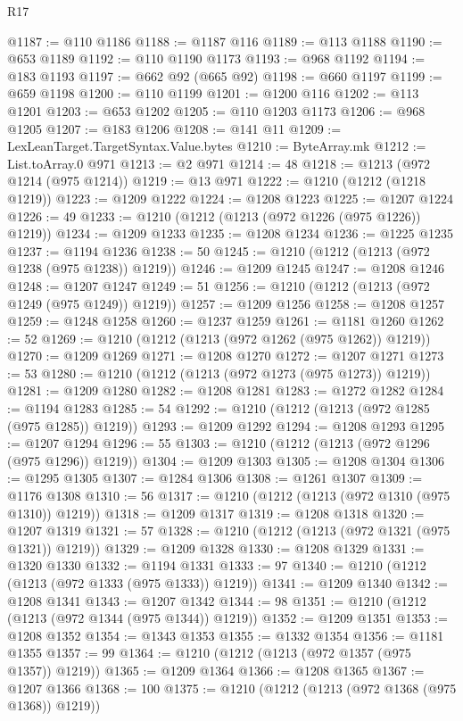 \begin{lexlean}{R17}
\begin{coremodule}
@1187 := @110 @1186
@1188 := @1187 @116
@1189 := @113 @1188
@1190 := @653 @1189
@1192 := @110 @1190 @1173
@1193 := @968 @1192
@1194 := @183 @1193
@1197 := @662 @92 (@665 @92)
@1198 := @660 @1197
@1199 := @659 @1198
@1200 := @110 @1199
@1201 := @1200 @116
@1202 := @113 @1201
@1203 := @653 @1202
@1205 := @110 @1203 @1173
@1206 := @968 @1205
@1207 := @183 @1206
@1208 := @141 @11
@1209 := LexLeanTarget.TargetSyntax.Value.bytes
@1210 := ByteArray.mk
@1212 := List.toArray.{0} @971
@1213 := @2 @971
@1214 := 48
@1218 := @1213 (@972 @1214 (@975 @1214))
@1219 := @13 @971
@1222 := @1210 (@1212 (@1218 @1219))
@1223 := @1209 @1222
@1224 := @1208 @1223
@1225 := @1207 @1224
@1226 := 49
@1233 := @1210 (@1212 (@1213 (@972 @1226 (@975 @1226)) @1219))
@1234 := @1209 @1233
@1235 := @1208 @1234
@1236 := @1225 @1235
@1237 := @1194 @1236
@1238 := 50
@1245 := @1210 (@1212 (@1213 (@972 @1238 (@975 @1238)) @1219))
@1246 := @1209 @1245
@1247 := @1208 @1246
@1248 := @1207 @1247
@1249 := 51
@1256 := @1210 (@1212 (@1213 (@972 @1249 (@975 @1249)) @1219))
@1257 := @1209 @1256
@1258 := @1208 @1257
@1259 := @1248 @1258
@1260 := @1237 @1259
@1261 := @1181 @1260
@1262 := 52
@1269 := @1210 (@1212 (@1213 (@972 @1262 (@975 @1262)) @1219))
@1270 := @1209 @1269
@1271 := @1208 @1270
@1272 := @1207 @1271
@1273 := 53
@1280 := @1210 (@1212 (@1213 (@972 @1273 (@975 @1273)) @1219))
@1281 := @1209 @1280
@1282 := @1208 @1281
@1283 := @1272 @1282
@1284 := @1194 @1283
@1285 := 54
@1292 := @1210 (@1212 (@1213 (@972 @1285 (@975 @1285)) @1219))
@1293 := @1209 @1292
@1294 := @1208 @1293
@1295 := @1207 @1294
@1296 := 55
@1303 := @1210 (@1212 (@1213 (@972 @1296 (@975 @1296)) @1219))
@1304 := @1209 @1303
@1305 := @1208 @1304
@1306 := @1295 @1305
@1307 := @1284 @1306
@1308 := @1261 @1307
@1309 := @1176 @1308
@1310 := 56
@1317 := @1210 (@1212 (@1213 (@972 @1310 (@975 @1310)) @1219))
@1318 := @1209 @1317
@1319 := @1208 @1318
@1320 := @1207 @1319
@1321 := 57
@1328 := @1210 (@1212 (@1213 (@972 @1321 (@975 @1321)) @1219))
@1329 := @1209 @1328
@1330 := @1208 @1329
@1331 := @1320 @1330
@1332 := @1194 @1331
@1333 := 97
@1340 := @1210 (@1212 (@1213 (@972 @1333 (@975 @1333)) @1219))
@1341 := @1209 @1340
@1342 := @1208 @1341
@1343 := @1207 @1342
@1344 := 98
@1351 := @1210 (@1212 (@1213 (@972 @1344 (@975 @1344)) @1219))
@1352 := @1209 @1351
@1353 := @1208 @1352
@1354 := @1343 @1353
@1355 := @1332 @1354
@1356 := @1181 @1355
@1357 := 99
@1364 := @1210 (@1212 (@1213 (@972 @1357 (@975 @1357)) @1219))
@1365 := @1209 @1364
@1366 := @1208 @1365
@1367 := @1207 @1366
@1368 := 100
@1375 := @1210 (@1212 (@1213 (@972 @1368 (@975 @1368)) @1219))

\end{coremodule}
\end{lexlean}
